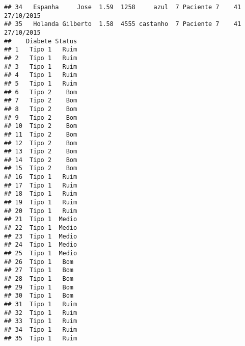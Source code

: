 \documentclass[]{article}
\begin{document}
\begin{verbatim}
## 34   Espanha     Jose  1.59  1258     azul  7 Paciente 7    41 27/10/2015
## 35   Holanda Gilberto  1.58  4555 castanho  7 Paciente 7    41 27/10/2015
##    Diabete Status
## 1   Tipo 1   Ruim
## 2   Tipo 1   Ruim
## 3   Tipo 1   Ruim
## 4   Tipo 1   Ruim
## 5   Tipo 1   Ruim
## 6   Tipo 2    Bom
## 7   Tipo 2    Bom
## 8   Tipo 2    Bom
## 9   Tipo 2    Bom
## 10  Tipo 2    Bom
## 11  Tipo 2    Bom
## 12  Tipo 2    Bom
## 13  Tipo 2    Bom
## 14  Tipo 2    Bom
## 15  Tipo 2    Bom
## 16  Tipo 1   Ruim
## 17  Tipo 1   Ruim
## 18  Tipo 1   Ruim
## 19  Tipo 1   Ruim
## 20  Tipo 1   Ruim
## 21  Tipo 1  Medio
## 22  Tipo 1  Medio
## 23  Tipo 1  Medio
## 24  Tipo 1  Medio
## 25  Tipo 1  Medio
## 26  Tipo 1   Bom 
## 27  Tipo 1   Bom 
## 28  Tipo 1   Bom 
## 29  Tipo 1   Bom 
## 30  Tipo 1   Bom 
## 31  Tipo 1   Ruim
## 32  Tipo 1   Ruim
## 33  Tipo 1   Ruim
## 34  Tipo 1   Ruim
## 35  Tipo 1   Ruim
\end{verbatim}
\end{document}
